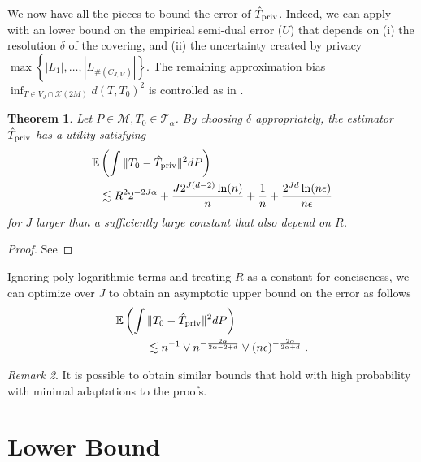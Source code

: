 \documentclass{article}
\theoremstyle{plain}
\newtheorem{theorem}{Theorem}[section]
\theoremstyle{definition}
\theoremstyle{remark}
\newtheorem{remark}[theorem]{Remark}
\newcommand{\E}[0]{\mathbb{E}}
\newcommand\p[1]{\left( {#1}\right)}
\newcommand\card[1]{\# \left( {#1}\right)}
\begin{document}
We now have all the pieces to bound the error of $\hat{T}_{\text{\normalshape priv}}$. Indeed, we can apply  with an lower bound on the empirical semi-dual error ($U$) that depends on (i) the resolution $\delta$ of the covering, and (ii) the uncertainty created by privacy $\max \left\{ |L_1|, \dots, |L_{\card{C_{J, M}}}| \right\}$. The remaining approximation bias $ \inf_{T \in V_J \cap \mathcal{X}(2M)} d(T, T_0)^2$ is controlled as in \cite{hutter2021minimax}.

\begin{theorem}
\label{theorem:bias_variance_tradeoff}
    Let $P\in\mathcal{M},T_0\in\mathcal{T}_\alpha$. 
    By choosing $\delta$ appropriately, the estimator $\hat{T}_{\text{\normalshape priv}}$ has a utility satisfying
    \begin{equation}
    \begin{aligned}
        \E &\p{\int \| T_0 - \hat{T}_{\text{\normalshape priv}}  \|^2 dP} \\
        &\lesssim R^2 2^{-2 J \alpha} + \frac{J 2^{J (d-2)}\ln(n)}{n}+ \frac{1}{n} +  \frac{2^{Jd} \ln (n \epsilon) }{n \epsilon}  
    \end{aligned}
    \end{equation}
for $J$ larger than a sufficiently large constant that also depend on $R$.
\end{theorem}
\begin{proof}
    See 
\end{proof}


Ignoring poly-logarithmic terms and treating $R$ as a constant for conciseness, we can optimize over $J$ to obtain an asymptotic upper bound on the error as follows
\begin{equation}
\label{eq:upper_bound}
    \begin{aligned}
        \E &\p{\int \| T_0 - \hat{T}_{\text{\normalshape priv}}  \|^2 dP} \\
        &\qquad\lesssim n^{-1} \vee n^{-\frac{2 \alpha}{2 \alpha - 2 + d}} \vee (n\epsilon)^{-\frac{2 \alpha}{2 \alpha + d}}   \;.
    \end{aligned}
    \end{equation}

    \begin{remark}
    It is possible to obtain similar bounds that hold with high probability with minimal adaptations to the proofs.
\end{remark}

\section{Lower Bound}
\label{sec:lowerbound}
\end{document}
